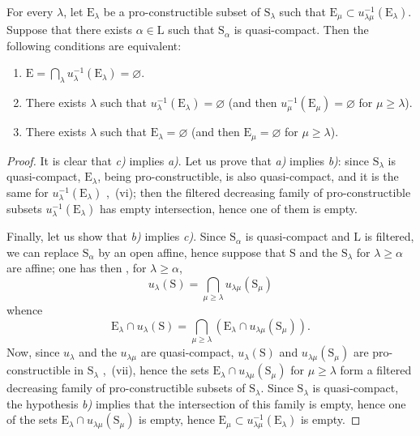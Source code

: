 \begin{corollary}[8.3.3]
\label{IV.8.3.3}
For every $\lambda$, let $\mathrm{E}_\lambda$ be a pro-constructible subset of $\mathrm{S}_\lambda$ such that $\mathrm{E}_\mu\subset u_{\lambda\mu}^{-1}(\mathrm{E}_\lambda)$.
Suppose that there exists $\alpha\in\mathrm{L}$ such that $\mathrm{S}_\alpha$ is quasi-compact.
Then the following conditions are equivalent:
\begin{enumerate}[label=\emph{\alph*)}]
  \item $\mathrm{E}=\bigcap_\lambda u_\lambda^{-1}(\mathrm{E}_\lambda)=\varnothing$.
  \item There exists $\lambda$ such that $u_\lambda^{-1}(\mathrm{E}_\lambda)=\varnothing$ (and then $u_\mu^{-1}(\mathrm{E}_\mu)=\varnothing$ for $\mu\geqslant\lambda$).
  \item There exists $\lambda$ such that $\mathrm{E}_\lambda=\varnothing$ (and then $\mathrm{E}_\mu=\varnothing$ for $\mu\geqslant\lambda$).
\end{enumerate}
\end{corollary}

\begin{proof}
It is clear that \emph{c)} implies \emph{a)}.
Let us prove that \emph{a)} implies \emph{b)}: since $\mathrm{S}_\lambda$ is quasi-compact, $\mathrm{E}_\lambda$, being pro-constructible, is also quasi-compact, and it is the same for $u_\lambda^{-1}(\mathrm{E}_\lambda)$ ,~(vi); then the filtered decreasing family of pro-constructible subsets $u_\lambda^{-1}(\mathrm{E}_\lambda)$ has empty intersection, hence  one of them is empty.

Finally, let us show that \emph{b)} implies \emph{c)}.
Since $\mathrm{S}_\alpha$ is quasi-compact and $\mathrm{L}$ is filtered, we can replace $\mathrm{S}_\alpha$ by an open affine, hence suppose  that $\mathrm{S}$ and the $\mathrm{S}_\lambda$ for $\lambda\geqslant\alpha$ are affine; one has then , for $\lambda\geqslant\alpha$,
\[
  u_\lambda(\mathrm{S})=\bigcap_{\mu\geqslant\lambda}u_{\lambda\mu}(\mathrm{S}_\mu)
\]
whence
\[
  \mathrm{E}_\lambda\cap u_\lambda(\mathrm{S})=\bigcap_{\mu\geqslant\lambda}(\mathrm{E}_\lambda\cap u_{\lambda\mu}(\mathrm{S}_\mu)).
\]
Now, since $u_\lambda$ and the $u_{\lambda\mu}$ are quasi-compact, $u_\lambda(\mathrm{S})$ and $u_{\lambda\mu}(\mathrm{S}_\mu)$ are pro-constructible in $\mathrm{S}_\lambda$ ,~(vii), hence the sets $\mathrm{E}_\lambda\cap u_{\lambda\mu}(\mathrm{S}_\mu)$ for $\mu\geqslant\lambda$ form a filtered decreasing family of pro-constructible subsets of $\mathrm{S}_\lambda$.
Since $\mathrm{S}_\lambda$ is quasi-compact, the hypothesis \emph{b)} implies that the intersection of this family is empty, hence  one of the sets $\mathrm{E}_\lambda\cap u_{\lambda\mu}(\mathrm{S}_\mu)$ is empty, hence $\mathrm{E}_\mu\subset u_{\lambda\mu}^{-1}(\mathrm{E}_\lambda)$ is empty.
\end{proof}

